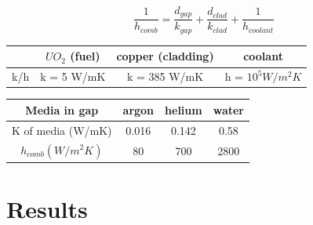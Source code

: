 \documentclass[12pt]{article}
\begin{document}
\[\frac{1}{h_{comb}} = \frac{d_{gap}}{k_{gap}} + \frac{d_{clad}}{k_{clad}} + \frac{1}{h_{coolant}}\]

\begin{center}
\begin{tabular}{ |c|c|c|c| } 
 \hline
  & $UO_2$ (fuel) & copper (cladding) & coolant \\ 
   \hline
 k/h & k = 5 W/mK & k = 385 W/mK & h =  $10^5 W/m^2K$ \\ 
 \hline
\end{tabular}
\end{center}

\begin{center}
\begin{tabular}{ |c|c|c|c| } 
 \hline
Media in gap  & argon & helium & water \\ 
   \hline
 K of media (W/mK) & 0.016 & 0.142 & 0.58  \\
 \hline
 $h_{comb} (W/m^2K)$ & 80 & 700 & 2800 \\ 
 \hline
\end{tabular}
\end{center}
\pagebreak

\section{Results}
\end{document}
